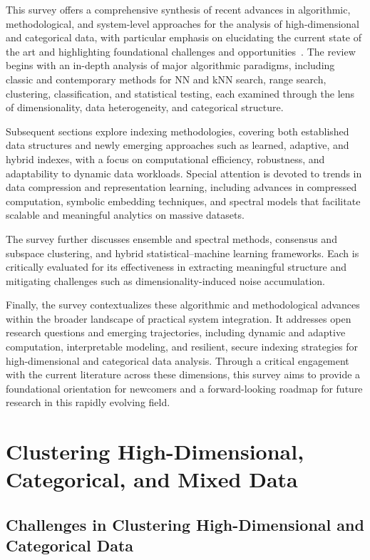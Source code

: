 \documentclass[sigconf]{acmart}
\begin{document}
This survey offers a comprehensive synthesis of recent advances in algorithmic, methodological, and system-level approaches for the analysis of high-dimensional and categorical data, with particular emphasis on elucidating the current state of the art and highlighting foundational challenges and opportunities~\cite{ref116,ref117,ref118}. The review begins with an in-depth analysis of major algorithmic paradigms, including classic and contemporary methods for NN and kNN search, range search, clustering, classification, and statistical testing, each examined through the lens of dimensionality, data heterogeneity, and categorical structure.

Subsequent sections explore indexing methodologies, covering both established data structures and newly emerging approaches such as learned, adaptive, and hybrid indexes, with a focus on computational efficiency, robustness, and adaptability to dynamic data workloads. Special attention is devoted to trends in data compression and representation learning, including advances in compressed computation, symbolic embedding techniques, and spectral models that facilitate scalable and meaningful analytics on massive datasets.

The survey further discusses ensemble and spectral methods, consensus and subspace clustering, and hybrid statistical--machine learning frameworks. Each is critically evaluated for its effectiveness in extracting meaningful structure and mitigating challenges such as dimensionality-induced noise accumulation.

Finally, the survey contextualizes these algorithmic and methodological advances within the broader landscape of practical system integration. It addresses open research questions and emerging trajectories, including dynamic and adaptive computation, interpretable modeling, and resilient, secure indexing strategies for high-dimensional and categorical data analysis. Through a critical engagement with the current literature across these dimensions, this survey aims to provide a foundational orientation for newcomers and a forward-looking roadmap for future research in this rapidly evolving field.

\section{Clustering High-Dimensional, Categorical, and Mixed Data}

\subsection{Challenges in Clustering High-Dimensional and Categorical Data}
\end{document}
